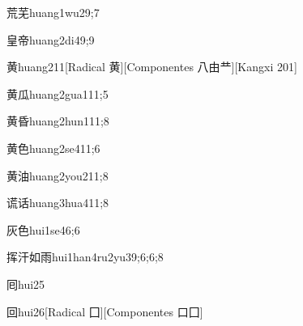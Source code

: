 \begin{verbete}{荒芜}{huang1wu2}{9;7}
\end{verbete}

\begin{verbete}{皇帝}{huang2di4}{9;9}
\end{verbete}

\begin{verbete}{黄}{huang2}{11}[Radical ⻩][Componentes 八由龷][Kangxi 201]
\end{verbete}

\begin{verbete}{黄瓜}{huang2gua1}{11;5}
\end{verbete}

\begin{verbete}{黄昏}{huang2hun1}{11;8}
\end{verbete}

\begin{verbete}{黄色}{huang2se4}{11;6}
\end{verbete}

\begin{verbete}{黄油}{huang2you2}{11;8}
\end{verbete}

\begin{verbete}{谎话}{huang3hua4}{11;8}
\end{verbete}

\begin{verbete}{灰色}{hui1se4}{6;6}
\end{verbete}

\begin{verbete}{挥汗如雨}{hui1han4ru2yu3}{9;6;6;8}
\end{verbete}

\begin{verbete}{囘}{hui2}{5}
\end{verbete}

\begin{verbete}{回}{hui2}{6}[Radical ⼞][Componentes 口⼞]
\end{verbete}

